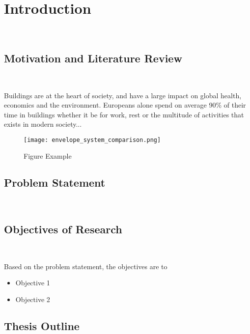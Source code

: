 
\chapter{Introduction}\
\label{ch:introduction}


\section{Motivation and Literature Review}\
\label{ch:motivation}

Buildings are at the heart of society, and have a large impact on global health, economics and the environment. Europeans alone spend on average 90\% of their time in buildings \cite{Staniaszek2014BPIE} whether it be for work, rest or the multitude of activities that exists in modern society...\\

  \begin{figure}[ht] %
    \begin{center}
      \texttt{[image: envelope\_system\_comparison.png]}
      \caption{Figure Example}
      \label{fig: comparison}
    \end{center} 
  \end{figure}

 
\section{Problem Statement}\


\section{Objectives of Research}\

Based on the problem statement, the objectives are to

\begin{itemize}
	\item Objective 1
	\item Objective 2
\end{itemize}


\section{Thesis Outline}\


